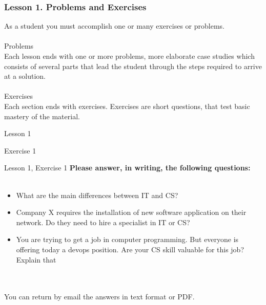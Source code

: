 \documentclass[aspectratio=1610]{beamer}
\begin{document}

\begin{frame}
\frametitle{Lesson 1. Problems and Exercises}
\LARGE
As a student you must accomplish one or many exercises or problems.\\~\\
\Large \alert{Problems}\\
Each lesson ends with one or more problems, more elaborate case studies which consists of several parts that lead the student through the steps required to arrive at a solution.
\\~\\ 
\Large \alert{Exercises} \\
Each section ends with exercises. Exercises are short questions, that test basic mastery of the material.
\end{frame}

\begin{frame}{Lesson 1}{}
\begin{center}
\Huge Exercise 1
\end{center}
\end{frame}

\begin{frame}{Lesson 1, Exercise 1}{}
\Large
\textbf{Please answer, in writing, the following questions:}\\~\\ 

\Large{
\begin{itemize}
    \item What are the main differences between IT and CS?
    \item Company X requires the installation of new software application on their network. Do they need to hire a specialist in IT or CS?
    \item You are trying to get a job in computer programming. But everyone is offering today a devops position. Are your CS skill valuable for this job? Explain that 
\end{itemize}}
\\~\\
You can return by email the answers in text format or PDF.
\end{frame}
\end{document}
